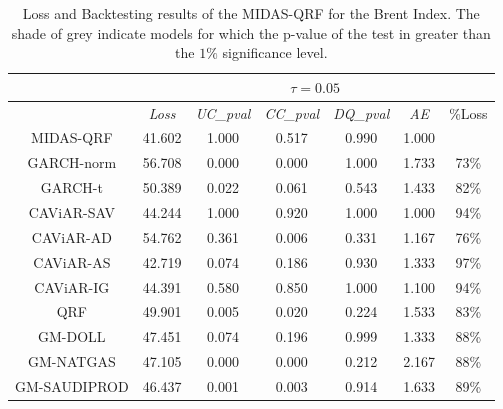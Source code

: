 \begin{table}[H]
\begin{tabular}{ccccccc}
                                                                                                  & \multicolumn{6}{c}{$\tau=0.05$}                          \\ \hline
                                                                                                  & \textit{Loss  } & \textit{UC\_pval} & \textit{CC\_pval} & \textit{DQ\_pval} & \textit{AE}    & \%Loss \\ \hline
\rowcolor[HTML]{D9D9D9} MIDAS-QRF                                            & 41.602 & 1.000    & 0.517    & 0.990    & 1.000 &        \\
GARCH-norm                                                                                        & 56.708 & 0.000    & 0.000    & 1.000    & 1.733 & 73\%   \\
\rowcolor[HTML]{D9D9D9}GARCH-t                                                                                           & 50.389 & 0.022    & 0.061    & 0.543    & 1.433 & 82\%   \\
\rowcolor[HTML]{D9D9D9} CAViAR-SAV                                           & 44.244 & 1.000    & 0.920    & 1.000    & 1.000 & 94\%   \\
CAViAR-AD                                                                                         & 54.762 & 0.361    & 0.006    & 0.331    & 1.167 & 76\%   \\
\rowcolor[HTML]{D9D9D9} CAViAR-AS                                                                                         & 42.719 & 0.074    & 0.186    & 0.930    & 1.333 & 97\%   \\
\rowcolor[HTML]{D9D9D9} CAViAR-IG                                            & 44.391 & 0.580    & 0.850    & 1.000    & 1.100 & 94\%   \\
QRF                                                                                               & 49.901 & 0.005    & 0.020    & 0.224    & 1.533 & 83\%   \\
\rowcolor[HTML]{D9D9D9}GM-DOLL & 47.451 & 0.074    & 0.196    & 0.999    & 1.333 & 88\%   \\
GM-NATGAS                                                                                         & 47.105 & 0.000    & 0.000    & 0.212    & 2.167 & 88\%   \\
GM-SAUDIPROD                                                                                      & 46.437 & 0.001    & 0.003    & 0.914    & 1.633 & 89\%  
\\ \hline
\end{tabular}
\caption{Loss and Backtesting results of the MIDAS-QRF for the Brent Index. The shade of grey indicate models for which the p-value of the test in greater than the $1\%$ significance level.}
\label{tab:brent}
\end{table}